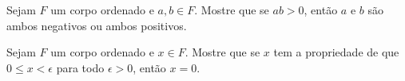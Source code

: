 \begin{exercise}
Sejam $F$ um corpo ordenado e $a,b \in F$. Mostre que se $ab>0$, então $a$ e $b$ são ambos negativos ou ambos positivos.
\end{exercise}

\begin{exercise}
Sejam $F$ um corpo ordenado e $x \in F$. Mostre que se $x$ tem a propriedade de que $0 \le x < \epsilon$ para todo $\epsilon > 0$, então $x=0$.
\end{exercise}